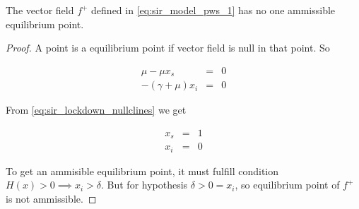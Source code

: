 \begin{lemma}
\label{th:equilibria_lockdown}
The vector field $f^+$ defined in \ref{eq:sir_model_pws_1} has no one ammissible equilibrium point.
\end{lemma}

\begin{proof}
A point is a equilibrium point if vector field is null in that point. So

\begin{equation}
\label{eq:sir_lockdown_nullclines}
    \begin{array}{ccc}
        \mu - \mu x_s &=& 0  \\
        - (\gamma + \mu)x_i &=& 0 
    \end{array}
\end{equation}

From \ref{eq:sir_lockdown_nullclines} we get

\begin{equation}
\label{eq:sir_lockdown_nullclines_demonstation}
    \begin{array}{ccc}
        x_s &=& 1  \\
        x_i &=& 0 
    \end{array}
\end{equation}

To get an ammisible equilibrium point, it must fulfill condition $H(x) > 0 \implies x_i > \delta$.
But for hypothesis $\delta > 0 = x_i$, so equilibrium point of $f^+$ is not ammissible.
\end{proof}